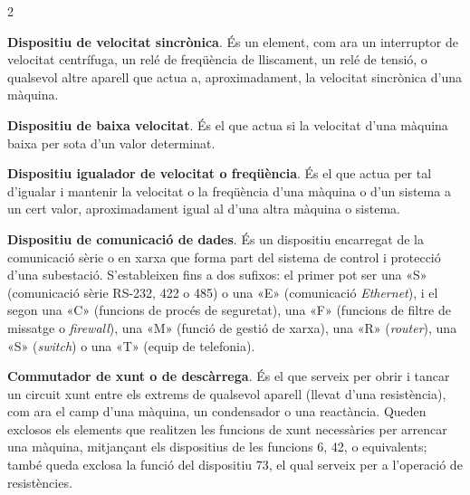 \begin{multicols}{2}
\begin{list}{}
		\item[\textbf{13}]   
		\textbf{Dispositiu de velocitat sincrònica}. És un element, com ara un interruptor de
		velocitat centrífuga, un relé de freqüència de lliscament, un relé
		de tensió, o qualsevol altre aparell que actua a, aproximadament, la
		velocitat sincrònica d'una màquina.
		
		
		\item[\textbf{14}]   
		\textbf{Dispositiu de baixa velocitat}. És el que actua si la velocitat d'una màquina baixa per sota d'un valor determinat.
		
		\item[\textbf{15}]  
		\textbf{Dispositiu igualador de velocitat o freqüència}. És el que
		actua per tal d'igualar i mantenir la velocitat o la  freqüència
		d'una màquina o d'un sistema a un cert valor, aproximadament igual
		al  d'una altra màquina o sistema.
		
		\item[\textbf{16}]  
		\textbf{Dispositiu de comunicació de dades}. És un dispositiu encarregat de la comunicació sèrie o en xarxa que forma part del  sistema de control i protecció d'una subestació. S'estableixen fins a dos sufixos: el primer pot ser una «S» (comunicació sèrie RS-232, 422 o 485) o una «E» (comunicació \textit{Ethernet}), i el segon una «C» (funcions de procés de seguretat), una «F» (funcions de filtre de missatge o \textit{firewall}), una «M» (funció de gestió de xarxa), una  «R» (\textit{router}), una «S» (\textit{switch}) o una «T» (equip de telefonia).
		
		\item[\textbf{17}]   
		  
		\textbf{Commutador de  xunt o de descàrrega}. És el que serveix per obrir i tancar
		un circuit xunt entre els extrems de qualsevol aparell (llevat d'una resistència), com ara el camp d'una màquina, un condensador o
		una reactància. Queden exclosos els elements que realitzen les
		funcions de xunt necessàries per arrencar una màquina, mitjançant
		els dispositius de les funcions 6, 42, o equivalents; també queda exclosa la funció
		del dispositiu 73, el qual serveix per a l'operació de resistències.
		

\end{list}
\end{multicols}
